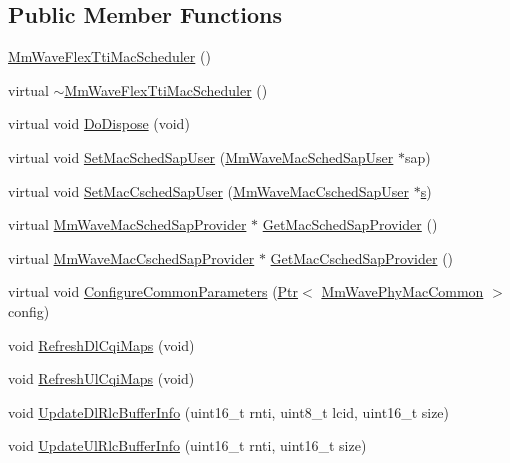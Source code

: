 \subsection*{Public Member Functions}
\begin{DoxyCompactItemize}
\item 
\hyperlink{classns3_1_1MmWaveFlexTtiMacScheduler_a3dcf6ebe69eb67f3bad16c8d2d3057cb}{Mm\+Wave\+Flex\+Tti\+Mac\+Scheduler} ()
\item 
virtual \hyperlink{classns3_1_1MmWaveFlexTtiMacScheduler_a5d3f87f23f51d2d50e330700a316ac20}{$\sim$\+Mm\+Wave\+Flex\+Tti\+Mac\+Scheduler} ()
\item 
virtual void \hyperlink{classns3_1_1MmWaveFlexTtiMacScheduler_a0a59403c28c44cc652c42da924038a5c}{Do\+Dispose} (void)
\item 
virtual void \hyperlink{classns3_1_1MmWaveFlexTtiMacScheduler_a7860bceeb64bb84656496797e4726795}{Set\+Mac\+Sched\+Sap\+User} (\hyperlink{classns3_1_1MmWaveMacSchedSapUser}{Mm\+Wave\+Mac\+Sched\+Sap\+User} $\ast$sap)
\item 
virtual void \hyperlink{classns3_1_1MmWaveFlexTtiMacScheduler_a32d876a899fe0f59e90e402193fc6a25}{Set\+Mac\+Csched\+Sap\+User} (\hyperlink{classns3_1_1MmWaveMacCschedSapUser}{Mm\+Wave\+Mac\+Csched\+Sap\+User} $\ast$\hyperlink{generate__test__data__lte__sinr_8m_ad83eeb3a142285d1243a08c6b7026df8}{s})
\item 
virtual \hyperlink{classns3_1_1MmWaveMacSchedSapProvider}{Mm\+Wave\+Mac\+Sched\+Sap\+Provider} $\ast$ \hyperlink{classns3_1_1MmWaveFlexTtiMacScheduler_af7c60c461f9b311432ec3842b92c2de8}{Get\+Mac\+Sched\+Sap\+Provider} ()
\item 
virtual \hyperlink{classns3_1_1MmWaveMacCschedSapProvider}{Mm\+Wave\+Mac\+Csched\+Sap\+Provider} $\ast$ \hyperlink{classns3_1_1MmWaveFlexTtiMacScheduler_a7590936c156caa937319cc7e042e4d62}{Get\+Mac\+Csched\+Sap\+Provider} ()
\item 
virtual void \hyperlink{classns3_1_1MmWaveFlexTtiMacScheduler_ad171296ecf0e2ceca9235e6566bfd8e2}{Configure\+Common\+Parameters} (\hyperlink{classns3_1_1Ptr}{Ptr}$<$ \hyperlink{classns3_1_1MmWavePhyMacCommon}{Mm\+Wave\+Phy\+Mac\+Common} $>$ config)
\item 
void \hyperlink{classns3_1_1MmWaveFlexTtiMacScheduler_a258b38ccd67574a92e83ee7797850a99}{Refresh\+Dl\+Cqi\+Maps} (void)
\item 
void \hyperlink{classns3_1_1MmWaveFlexTtiMacScheduler_a37e57c25e03ec4c1865025f8e5301d32}{Refresh\+Ul\+Cqi\+Maps} (void)
\item 
void \hyperlink{classns3_1_1MmWaveFlexTtiMacScheduler_a596a7a467d1cc60189f6123833df8df8}{Update\+Dl\+Rlc\+Buffer\+Info} (uint16\+\_\+t rnti, uint8\+\_\+t lcid, uint16\+\_\+t size)
\item 
void \hyperlink{classns3_1_1MmWaveFlexTtiMacScheduler_a3ee98517bf46d32cd07cd55bcc8c9f86}{Update\+Ul\+Rlc\+Buffer\+Info} (uint16\+\_\+t rnti, uint16\+\_\+t size)
\end{DoxyCompactItemize}
